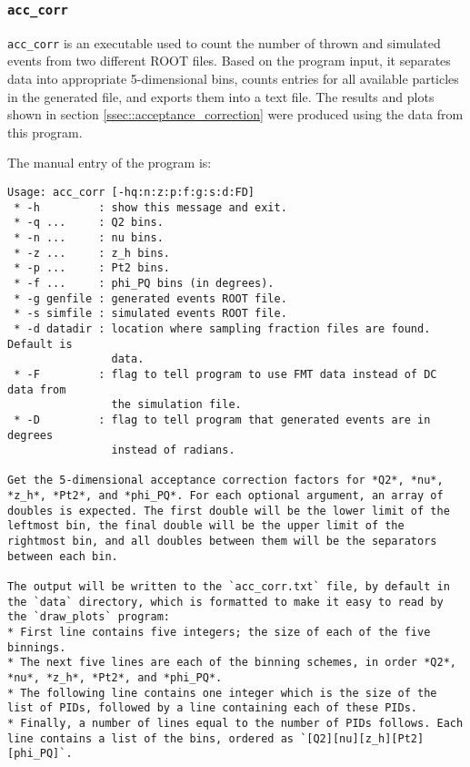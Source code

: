 \subsubsection{\texttt{acc\_corr}}
    \texttt{acc\_corr} is an executable used to count the number of thrown and simulated events from two different ROOT files.
    Based on the program input, it separates data into appropriate 5-dimensional bins, counts entries for all available particles in the generated file, and exports them into a text file.
    The results and plots shown in section \ref{ssec::acceptance_correction} were produced using the data from this program.

    The manual entry of the program is:
    \begin{lstlisting}
Usage: acc_corr [-hq:n:z:p:f:g:s:d:FD]
 * -h         : show this message and exit.
 * -q ...     : Q2 bins.
 * -n ...     : nu bins.
 * -z ...     : z_h bins.
 * -p ...     : Pt2 bins.
 * -f ...     : phi_PQ bins (in degrees).
 * -g genfile : generated events ROOT file.
 * -s simfile : simulated events ROOT file.
 * -d datadir : location where sampling fraction files are found. Default is
                data.
 * -F         : flag to tell program to use FMT data instead of DC data from
                the simulation file.
 * -D         : flag to tell program that generated events are in degrees
                instead of radians.

Get the 5-dimensional acceptance correction factors for *Q2*, *nu*, *z_h*, *Pt2*, and *phi_PQ*. For each optional argument, an array of doubles is expected. The first double will be the lower limit of the leftmost bin, the final double will be the upper limit of the rightmost bin, and all doubles between them will be the separators between each bin.

The output will be written to the `acc_corr.txt` file, by default in the `data` directory, which is formatted to make it easy to read by the `draw_plots` program:
* First line contains five integers; the size of each of the five binnings.
* The next five lines are each of the binning schemes, in order *Q2*, *nu*, *z_h*, *Pt2*, and *phi_PQ*.
* The following line contains one integer which is the size of the list of PIDs, followed by a line containing each of these PIDs.
* Finally, a number of lines equal to the number of PIDs follows. Each line contains a list of the bins, ordered as `[Q2][nu][z_h][Pt2][phi_PQ]`.
    \end{lstlisting}
